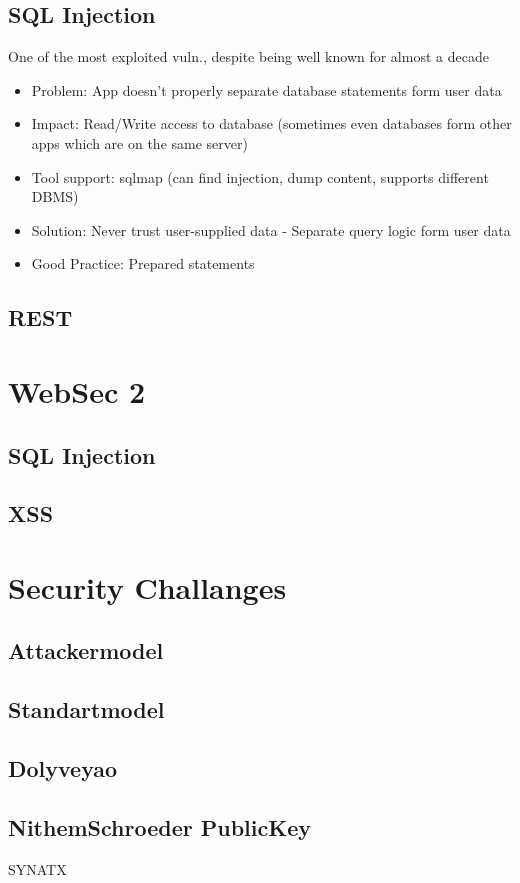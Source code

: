 \documentclass[a4paper, 12pt]{article}
\begin{document}
\subsection{SQL Injection}
One of the most exploited vuln., despite being well known for almost a decade
\begin{itemize}
\item Problem: App doesn't properly separate database statements form user data
\item Impact: Read/Write access to database (sometimes even databases form other apps which are on the same server)
\item Tool support: sqlmap (can find injection, dump content, supports different DBMS)
\item Solution: Never trust user-supplied data - Separate query logic form user data
\item Good Practice: Prepared statements
\end{itemize}
\subsection{REST}

\section{WebSec 2}
\subsection{SQL Injection}
\subsection{XSS}

\section{Security Challanges}
\subsection{Attackermodel}
\subsection{Standartmodel}
\subsection{Dolyveyao}
\subsection{NithemSchroeder PublicKey}
SYNATX
\end{document}
